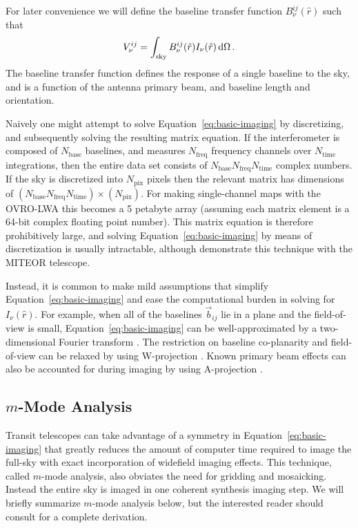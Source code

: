 \documentclass[twocolumn]{aastex61}
\renewcommand{\d}{{\rm d}}
\begin{document}
For later convenience we will define the baseline transfer function $B^{ij}_\nu(\hat r)$ such that
\begin{equation}\label{eq:baseline-transfer-function}
    V^{ij}_\nu = \int_\text{sky} B^{ij}_\nu(\hat r) I_\nu(\hat r) \,\d\Omega \, .
\end{equation}
The baseline transfer function defines the response of a single baseline to the sky, and is a
function of the antenna primary beam, and baseline length and orientation.

Naively one might attempt to solve Equation~\ref{eq:basic-imaging} by discretizing, and subsequently
solving the resulting matrix equation. If the interferometer is composed of $N_\text{base}$
baselines, and measures $N_\text{freq}$ frequency channels over $N_\text{time}$ integrations, then
the entire data set consists of $N_\text{base}N_\text{freq}N_\text{time}$ complex numbers. If the
sky is discretized into $N_\text{pix}$ pixels then the relevant matrix has dimensions of
$(N_\text{base}N_\text{freq}N_\text{time})\times(N_\text{pix})$. For making single-channel maps with
the OVRO-LWA this becomes a 5 petabyte array (assuming each matrix element is a 64-bit complex
floating point number).  This matrix equation is therefore prohibitively large, and solving
Equation~\ref{eq:basic-imaging} by means of discretization is usually intractable, although
\citet{2017MNRAS.465.2901Z} demonstrate this technique with the MITEOR telescope.

Instead, it is common to make mild assumptions that simplify Equation~\ref{eq:basic-imaging} and
ease the computational burden in solving for $I_\nu(\hat r)$. For example, when all of the baselines
$\vec b_{ij}$ lie in a plane and the field-of-view is small, Equation~\ref{eq:basic-imaging} can be
well-approximated by a two-dimensional Fourier transform \citep{2001isra.book.....T}. The
restriction on baseline co-planarity and field-of-view can be relaxed by using W-projection
\citep{2008ISTSP...2..647C}. Known primary beam effects can also be accounted for during imaging by
using A-projection \citep{2013ApJ...770...91B}.

\subsection{$m$-Mode Analysis}\label{sec:mmode-analysis}

Transit telescopes can take advantage of a symmetry in Equation~\ref{eq:basic-imaging} that greatly
reduces the amount of computer time required to image the full-sky with exact incorporation of
widefield imaging effects. This technique, called $m$-mode analysis, also obviates the need for
gridding and mosaicking. Instead the entire sky is imaged in one coherent synthesis imaging step.  We
will briefly summarize $m$-mode analysis below, but the interested reader should consult
\citet{2014ApJ...781...57S, 2015PhRvD..91h3514S} for a complete derivation.
\end{document}
